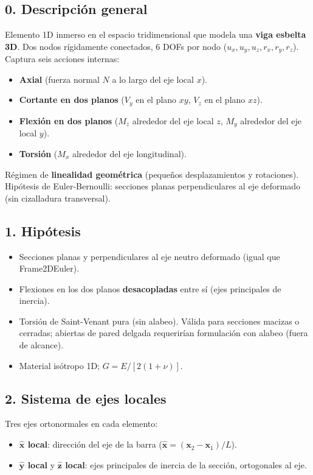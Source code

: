 \documentclass[11pt,letterpaper,oneside]{report}
\begin{document}
\subsection{0. Descripción general}
Elemento 1D inmerso en el espacio tridimensional que modela una \textbf{viga esbelta 3D}. Dos nodos rígidamente conectados, 6 DOFs por nodo ($u_x, u_y, u_z, r_x, r_y, r_z$). Captura seis acciones internas:

\begin{itemize}
  \item \textbf{Axial} (fuerza normal $N$ a lo largo del eje local $x$).
  \item \textbf{Cortante en dos planos} ($V_y$ en el plano $xy$, $V_z$ en el plano $xz$).
  \item \textbf{Flexión en dos planos} ($M_z$ alrededor del eje local $z$, $M_y$ alrededor del eje local $y$).
  \item \textbf{Torsión} ($M_x$ alrededor del eje longitudinal).
\end{itemize}

Régimen de \textbf{linealidad geométrica} (pequeños desplazamientos y rotaciones). Hipótesis de Euler-Bernoulli: secciones planas perpendiculares al eje deformado (sin cizalladura transversal).

\subsection{1. Hipótesis}
\begin{itemize}
  \item Secciones planas y perpendiculares al eje neutro deformado (igual que Frame2DEuler).
  \item Flexiones en los dos planos \textbf{desacopladas} entre sí (ejes principales de inercia).
  \item Torsión de Saint-Venant pura (sin alabeo). Válida para secciones macizas o cerradas; abiertas de pared delgada requerirían formulación con alabeo (fuera de alcance).
  \item Material isótropo 1D; $G = E/[2(1+\nu)]$.
\end{itemize}

\subsection{2. Sistema de ejes locales}
Tres ejes ortonormales en cada elemento:
\begin{itemize}
  \item \textbf{$\hat{\mathbf x}$ local}: dirección del eje de la barra ($\hat{\mathbf x} = (\mathbf x_2 - \mathbf x_1)/L$).
  \item \textbf{$\hat{\mathbf y}$ local} y \textbf{$\hat{\mathbf z}$ local}: ejes principales de inercia de la sección, ortogonales al eje.
\end{itemize}
\end{document}
